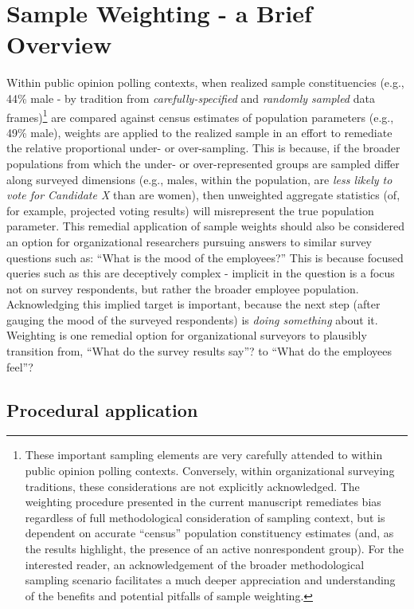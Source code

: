 \documentclass[
  ,man,floatsintext]{apa6}
\begin{document}
\hypertarget{sample-weighting---a-brief-overview}{%
\section{Sample Weighting - a Brief Overview}\label{sample-weighting---a-brief-overview}}

Within public opinion polling contexts, when realized sample constituencies (e.g., 44\% male - by tradition from \emph{carefully-specified} and \emph{randomly sampled} data frames)\footnote{These important sampling elements are very carefully attended to within public opinion polling contexts. Conversely, within organizational surveying traditions, these considerations are not explicitly acknowledged. The weighting procedure presented in the current manuscript remediates bias regardless of full methodological consideration of sampling context, but is dependent on accurate ``census'' population constituency estimates (and, as the results highlight, the presence of an active nonrespondent group). For the interested reader, an acknowledgement of the broader methodological sampling scenario facilitates a much deeper appreciation and understanding of the benefits and potential pitfalls of sample weighting.} are compared against census estimates of population parameters (e.g., 49\% male), weights are applied to the realized sample in an effort to remediate the relative proportional under- or over-sampling. This is because, if the broader populations from which the under- or over-represented groups are sampled differ along surveyed dimensions (e.g., males, within the population, are \emph{less likely to vote for Candidate X} than are women), then unweighted aggregate statistics (of, for example, projected voting results) will misrepresent the true population parameter. This remedial application of sample weights should also be considered an option for organizational researchers pursuing answers to similar survey questions such as: ``What is the mood of the employees?'' This is because focused queries such as this are deceptively complex - implicit in the question is a focus not on survey respondents, but rather the broader employee population. Acknowledging this implied target is important, because the next step (after gauging the mood of the surveyed respondents) is \emph{doing something} about it. Weighting is one remedial option for organizational surveyors to plausibly transition from, ``What do the survey results say''? to ``What do the employees feel''?

\hypertarget{procedural-application}{%
\subsection{Procedural application}\label{procedural-application}}
\end{document}
